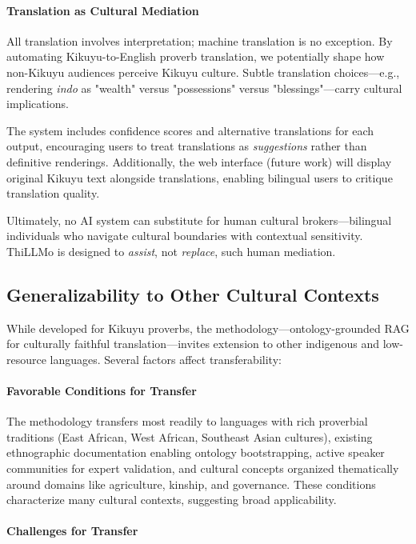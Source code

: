 \paragraph{Translation as Cultural Mediation}

All translation involves interpretation; machine translation is no exception. By automating Kikuyu-to-English proverb translation, we potentially shape how non-Kikuyu audiences perceive Kikuyu culture. Subtle translation choices—e.g., rendering \emph{indo} as "wealth" versus "possessions" versus "blessings"—carry cultural implications.

The system includes confidence scores and alternative translations for each output, encouraging users to treat translations as \emph{suggestions} rather than definitive renderings. Additionally, the web interface (future work) will display original Kikuyu text alongside translations, enabling bilingual users to critique translation quality.

Ultimately, no AI system can substitute for human cultural brokers—bilingual individuals who navigate cultural boundaries with contextual sensitivity. ThiLLMo is designed to \emph{assist}, not \emph{replace}, such human mediation.

\subsection{Generalizability to Other Cultural Contexts}
\label{subsec:generalizability}

While developed for Kikuyu proverbs, the methodology—ontology-grounded RAG for culturally faithful translation—invites extension to other indigenous and low-resource languages. Several factors affect transferability:

\paragraph{Favorable Conditions for Transfer}

The methodology transfers most readily to languages with rich proverbial traditions (East African, West African, Southeast Asian cultures), existing ethnographic documentation enabling ontology bootstrapping, active speaker communities for expert validation, and cultural concepts organized thematically around domains like agriculture, kinship, and governance. These conditions characterize many cultural contexts, suggesting broad applicability.

\paragraph{Challenges for Transfer}

